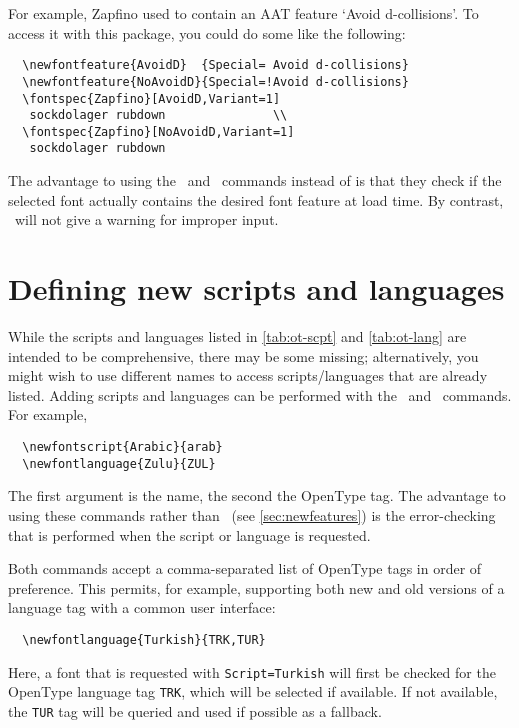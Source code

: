\documentclass[a4paper]{l3doc}
\begin{document}
For example, Zapfino used to
contain an AAT feature `Avoid d-collisions'. To access it
with this package, you could do some like the following:

\begin{Verbatim}
  \newfontfeature{AvoidD}  {Special= Avoid d-collisions}
  \newfontfeature{NoAvoidD}{Special=!Avoid d-collisions}
  \fontspec{Zapfino}[AvoidD,Variant=1]
   sockdolager rubdown               \\
  \fontspec{Zapfino}[NoAvoidD,Variant=1]
   sockdolager rubdown
\end{Verbatim}

The advantage to using the \cmd\newAATfeature\ and \cmd\newopentypefeature\
commands instead of  is that they check if the selected font actually contains the desired font
feature at load time. By contrast, \cmd\newfontfeature\ will not give a warning
for improper input.


\section{Defining new scripts and languages}
\label{sec:newscriptlang}

\DescribeMacro{\newfontscript}
\DescribeMacro{\newfontlanguage}
While the scripts and languages listed in \ref{tab:ot-scpt} and \ref{tab:ot-lang}
are intended to be comprehensive, there may be some missing; alternatively,
you might wish to use different names to access scripts/languages that are
already listed.
Adding scripts and languages can be performed with the \cmd\newfontscript\
and \cmd\newfontlanguage\ commands. For example,
\begin{Verbatim}
  \newfontscript{Arabic}{arab}
  \newfontlanguage{Zulu}{ZUL}
\end{Verbatim}
The first argument is the  name, the second the OpenType
tag. The advantage to using these commands rather than \cmd\newfontfeature\
(see \vref{sec:newfeatures}) is the error-checking that is performed when
the script or language is requested.

Both commands accept a comma-separated list of OpenType tags in order of preference.
This permits, for example, supporting both new and old versions of a language tag with
a common user interface:
\begin{Verbatim}
  \newfontlanguage{Turkish}{TRK,TUR}
\end{Verbatim}
Here, a font that is requested with \verb|Script=Turkish| will first be checked for the
OpenType language tag \verb|TRK|, which will be selected if available. If not available,
the \verb|TUR| tag will be queried and used if possible as a fallback.
\end{document}
